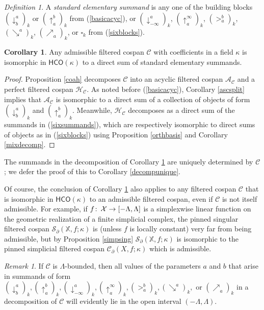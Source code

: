 \documentclass[11pt]{amsart}
\theoremstyle{definition}
\newtheorem{cor}[theorem]{Corollary}
\theoremstyle{remark}
\newtheorem{dfn}[theorem]{Definition}
\newtheorem{remark}[theorem]{Remark}
\numberwithin{equation}{section}
\def\co{\colon\thinspace}
\begin{document}
\begin{dfn}\label{sesdef}
	A \emph{standard elementary summand} is any one of the building blocks $(\downarrow_{b}^{a})_k$ or $(\uparrow_{a}^{b})_k$ from (\ref{basicacyc}), or $(\downarrow^{a}_{-\infty})_k$, $(\uparrow_{a}^{\infty})_k$,  $(>_{a}^{b})_k$, $(\searrow^a)_k$, $(\nearrow_a)_k$, or $\square_k$ from (\ref{sixblocks}). 
\end{dfn}

\begin{cor}\label{decompexists}
	Any admissible filtered cospan $\mathcal{C}$ with coefficients in a field $\kappa$ is isomorphic in $\mathsf{HCO}(\kappa)$ to a direct sum of standard elementary summands.
\end{cor}

\begin{proof}
	Proposition \ref{coah} decomposes $\mathcal{C}$ into an acyclic filtered cospan $\mathcal{A}_{\mathcal{C}}$ and a perfect filtered cospan $\mathcal{H}_{\mathcal{C}}$.  As noted before (\ref{basicacyc}), Corollary \ref{ascsplit} implies that $\mathcal{A}_{\mathcal{C}}$ is isomorphic to a direct sum of a collection of objects of form $(\downarrow^{a}_{b})_k$ and $(\uparrow_{a}^{b})_k$.
	Meanwhile, $\mathcal{H}_{\mathcal{C}}$ decomposes as a direct sum of the summands in (\ref{sixsummands}), which are respectively isomorphic to direct sums of objects as in (\ref{sixblocks}) using Proposition \ref{orthbasis} and Corollary \ref{mixdecomp}.
\end{proof}

The summands in the decomposition of Corollary \ref{decompexists} are uniquely determined by $\mathcal{C}$; we defer the proof of this to Corollary \ref{decompunique}.

Of course, the conclusion of Corollary \ref{decompexists} also applies to any filtered cospan $\mathcal{C}$ that is isomorphic in $\mathsf{HCO}(\kappa)$ to an admissible filtered cospan, even if $\mathcal{C}$ is not itself admissible. For example, if $f\co\mathcal{X}\to [-\Lambda,\Lambda]$ is a simplexwise linear function on the geometric realization of a finite simplicial complex, the pinned singular filtered cospan $\mathcal{S}_{\partial}(\mathbb{X},f;\kappa)$ is (unless $f$ is locally constant) very far from being admissible, but by Proposition \ref{simpsing} $\mathcal{S}_{\partial}(\mathbb{X},f;\kappa)$ is isomorphic to the pinned simplicial filtered cospan $\mathcal{C}_{\partial}(X,f;\kappa)$ which is admissible.
 
\begin{remark}
	If $\mathcal{C}$ is $\Lambda$-bounded, then all values of the parameters $a$ and $b$ that arise in summands of form  $(\downarrow_{b}^{a})_k,(\uparrow_{a}^{b})_k,(\downarrow^{a}_{-\infty})_k, (\uparrow_{a}^{\infty})_k,  (>_{a}^{b})_k, (\searrow^a)_k,$ or $(\nearrow_a)_k$ in a decomposition of $\mathcal{C}$ will evidently lie in the open interval $(-\Lambda,\Lambda)$. 
\end{remark} 
\end{document}
